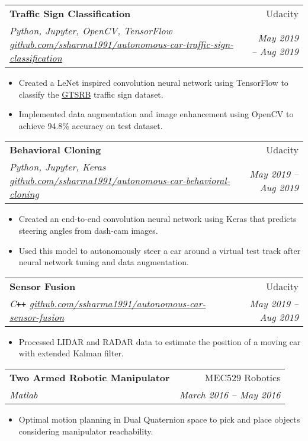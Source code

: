 \documentclass[letterpaper,10pt]{article}
\makeatletter
\newcommand{\resumeHeading}[4]{
  \vspace{-1pt}
    \begin{tabular*}{0.97\textwidth}{l@{\extracolsep{\fill}}r}
      \textbf{#1} & #2 \vspace{-2pt}\\ \vspace{1pt}
      \textit{\small#3} & \textit{\small #4} \\
    \end{tabular*}
}
\newcommand{\resumeItemListStart}{
\vspace{-7pt}
\begin{itemize}[leftmargin=14pt]
}
\newcommand{\resumeItemListEnd}{
\vspace{+7pt}
\end{itemize}
}
\newcommand{\resumeItem}[1]{
  \item\small{
      {#1 \vspace{-7pt}
      }
  }
}
\makeatother
\begin{document}
	\vspace{-2pt}
    \resumeHeading{Traffic Sign Classification}{Udacity}{Python, Jupyter, OpenCV, TensorFlow \href{https://github.com/ssharma1991/autonomous-car-traffic-sign-classification}{github.com/ssharma1991/autonomous-car-traffic-sign-classification}}{May 2019 -- Aug 2019}
    \resumeItemListStart
	    \resumeItem{Created a LeNet inspired convolution neural network using TensorFlow to classify the \href{http://benchmark.ini.rub.de/?section=gtsrb}{GTSRB} traffic sign dataset.}
	    \resumeItem{Implemented data augmentation and image enhancement using OpenCV to achieve 94.8\% accuracy on test dataset.}
    \resumeItemListEnd
    
    \vspace{-2pt}
    \resumeHeading{Behavioral Cloning}{Udacity}{Python, Jupyter, Keras \href{https://github.com/ssharma1991/autonomous-car-behavioral-cloning}{github.com/ssharma1991/autonomous-car-behavioral-cloning}}{May 2019 -- Aug 2019}
    \resumeItemListStart
	    \resumeItem{Created an end-to-end convolution neural network using Keras that predicts steering angles from dash-cam images.}
	    \resumeItem{Used this model to autonomously steer a car  around a virtual test track after neural network tuning and data augmentation.}
    \resumeItemListEnd
    
    \vspace{-2pt}
    \resumeHeading{Sensor Fusion}{Udacity}{C\texttt{++} \href{https://github.com/ssharma1991/autonomous-car-sensor-fusion}{github.com/ssharma1991/autonomous-car-sensor-fusion}}{May 2019 -- Aug 2019}
    \resumeItemListStart
	    \resumeItem{Processed LIDAR and RADAR data to estimate the position of a moving car with extended Kalman filter.}
    \resumeItemListEnd
    
    

    
    \vspace{-2pt}
    \resumeHeading{Two Armed Robotic Manipulator}{MEC529 Robotics}{Matlab}{March 2016 -- May 2016}
    \resumeItemListStart
    	\resumeItem{Optimal motion planning in Dual Quaternion space to pick and place objects considering manipulator reachability.}
    \resumeItemListEnd
\end{document}

